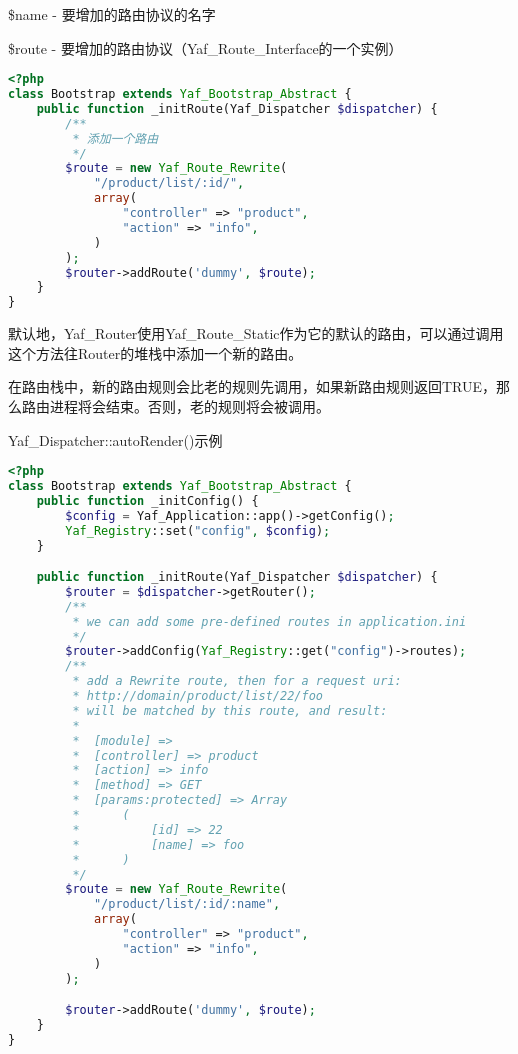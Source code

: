 \begin{compactitem}
\item \$name - 要增加的路由协议的名字

\item \$route - 要增加的路由协议（Yaf\_Route\_Interface的一个实例）

\end{compactitem}

\begin{lstlisting}[language=PHP]
<?php
class Bootstrap extends Yaf_Bootstrap_Abstract {
    public function _initRoute(Yaf_Dispatcher $dispatcher) {
        /**
         * 添加一个路由
         */
        $route = new Yaf_Route_Rewrite(
            "/product/list/:id/",
            array(
                "controller" => "product",
                "action" => "info",
            )
        );
        $router->addRoute('dummy', $route);
    }
}
\end{lstlisting}


默认地，Yaf\_Router使用Yaf\_Route\_Static作为它的默认的路由，可以通过调用这个方法往Router的堆栈中添加一个新的路由。

在路由栈中，新的路由规则会比老的规则先调用，如果新路由规则返回TRUE，那么路由进程将会结束。否则，老的规则将会被调用。

\begin{example}
Yaf\_Dispatcher::autoRender()示例
\begin{lstlisting}[language=PHP]
<?php
class Bootstrap extends Yaf_Bootstrap_Abstract {
    public function _initConfig() {
        $config = Yaf_Application::app()->getConfig();
        Yaf_Registry::set("config", $config);
    }

    public function _initRoute(Yaf_Dispatcher $dispatcher) {
        $router = $dispatcher->getRouter();
        /**
         * we can add some pre-defined routes in application.ini
         */
        $router->addConfig(Yaf_Registry::get("config")->routes);
        /**
         * add a Rewrite route, then for a request uri:
         * http://domain/product/list/22/foo
         * will be matched by this route, and result:
         *
         *  [module] =>
         *  [controller] => product
         *  [action] => info
         *  [method] => GET
         *  [params:protected] => Array
         *      (
         *          [id] => 22
         *          [name] => foo
         *      )
         */
        $route = new Yaf_Route_Rewrite(
            "/product/list/:id/:name",
            array(
                "controller" => "product",
                "action" => "info",
            )
        );

        $router->addRoute('dummy', $route);
    }
}
\end{lstlisting}
\end{example}







